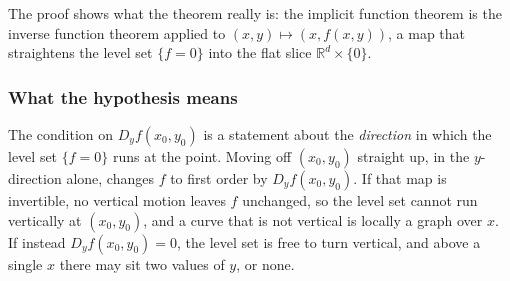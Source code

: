 The proof shows what the theorem really is: the implicit function theorem is the inverse function
theorem applied to $(x,y) \mapsto (x,f(x,y))$, a map that straightens the level set
$\{f = 0\}$ into the flat slice $\mathbb{R}^d\times\{0\}$.

\subsubsection*{What the hypothesis means}

The condition on $D_yf(x_0,y_0)$ is a statement about the \emph{direction} in which the level
set $\{f=0\}$ runs at the point. Moving off $(x_0,y_0)$ straight up, in the $y$-direction alone,
changes $f$ to first order by $D_yf(x_0,y_0)$. If that map is invertible, no vertical motion
leaves $f$ unchanged, so the level set cannot run vertically at $(x_0,y_0)$, and a curve that is
not vertical is locally a graph over $x$. If instead $D_yf(x_0,y_0)=0$, the level set is free
to turn vertical, and above a single $x$ there may sit two values of $y$, or none.

